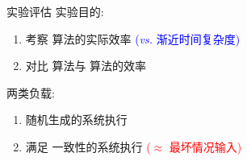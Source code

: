 \begin{frame}{实验评估}
  实验目的:
  \begin{enumerate}
	\item 考察 \readcentric{} 算法的实际效率 
	  \textcolor{blue}{\small ({\it vs.} 渐近时间复杂度)}
	\item 对比 \readcentric{} 算法与 \rwclosure{} 算法的效率
  \end{enumerate}

  \pause
  \vspace{0.50cm}

  两类负载:
  \begin{enumerate}
	\item 随机生成的系统执行
	\item 满足 \PRAM{} 一致性的系统执行 \textcolor{red}{\small ($\approx$ 最坏情况输入)}
  \end{enumerate}
\end{frame}
